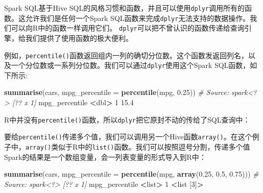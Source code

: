 \documentclass[
]{article}
\newenvironment{Shaded}{\begin{snugshade}}{\end{snugshade}}
\newcommand{\CommentTok}[1]{\textcolor[rgb]{0.56,0.35,0.01}{\textit{#1}}}
\newcommand{\DataTypeTok}[1]{\textcolor[rgb]{0.13,0.29,0.53}{#1}}
\newcommand{\DecValTok}[1]{\textcolor[rgb]{0.00,0.00,0.81}{#1}}
\newcommand{\FloatTok}[1]{\textcolor[rgb]{0.00,0.00,0.81}{#1}}
\newcommand{\KeywordTok}[1]{\textcolor[rgb]{0.13,0.29,0.53}{\textbf{#1}}}
\newcommand{\NormalTok}[1]{#1}
\newcommand{\OperatorTok}[1]{\textcolor[rgb]{0.81,0.36,0.00}{\textbf{#1}}}
\newcommand{\StringTok}[1]{\textcolor[rgb]{0.31,0.60,0.02}{#1}}
\begin{document}
Spark SQL基于Hive
SQL的风格习惯和函数，并且可以使用\texttt{dplyr}调用所有的函数。这允许我们是任何一个Spark
SQL函数来完成\texttt{dplyr}无法支持的数据操作。我们可以向R中的函数一样调用它们。
\texttt{dplyr}可以把不曾认识的函数传递给查询引擎，给我们提供了使用函数的极大便利。

例如，\texttt{percentile()}函数返回组内一列的确切分位数。这个函数发返回列名，以及一个分位数或一系列分位数。我们可以通过\texttt{dplyr}使用这个Spark
SQL函数，如下所示:

\begin{Shaded}
\begin{Highlighting}[]
\KeywordTok{summarise}\NormalTok{(cars, }\DataTypeTok{mpg_percentile =} \KeywordTok{percentile}\NormalTok{(mpg, }\FloatTok{0.25}\NormalTok{))}
\CommentTok{# Source: spark<?> [?? x 1]}
\NormalTok{ mpg_percentile}
 \OperatorTok{<}\NormalTok{dbl}\OperatorTok{>}
\DecValTok{1} \FloatTok{15.4}
\end{Highlighting}
\end{Shaded}

R中并没有\texttt{percentile()}函数，所以\texttt{dplyr}把它原封不动的传给了SQL查询中：

\begin{Shaded}
\end{Shaded}

要给\texttt{percentile()}传递多个值，我们可以调用另一个Hive函数\texttt{array()}。在这个例子中，\texttt{array()}类似于R中的\texttt{list()}函数。我们可以按照逗号分割，传递多个值Spark的结果是一个数组变量，会一列表变量的形式导入到R中：

\begin{Shaded}
\begin{Highlighting}[]
\KeywordTok{summarise}\NormalTok{(cars, }\DataTypeTok{mpg_percentile =} \KeywordTok{percentile}\NormalTok{(mpg, }\KeywordTok{array}\NormalTok{(}\FloatTok{0.25}\NormalTok{, }\FloatTok{0.5}\NormalTok{, }\FloatTok{0.75}\NormalTok{)))}
\CommentTok{# Source: spark<?> [?? x 1]}
\NormalTok{ mpg_percentile}
 \OperatorTok{<}\NormalTok{list}\OperatorTok{>}
\DecValTok{1} \OperatorTok{<}\NormalTok{list [}\DecValTok{3}\NormalTok{]}\OperatorTok{>}
\end{Highlighting}
\end{Shaded}
\end{document}
